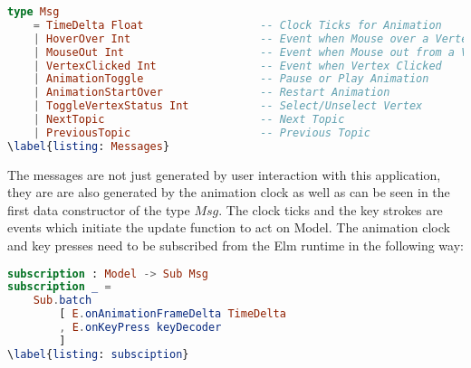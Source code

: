 \begin{lstlisting}[language=elm
                  , caption={
                              Abstract Data Type Msg with it's Data Constructors.
                              These messages are emanated from buttons, graph vertices
                              system clocks and are received by the update function
                              to change the $Model$, which carries the state of the
                              program.
                  }
                  ]
type Msg
    = TimeDelta Float                  -- Clock Ticks for Animation
    | HoverOver Int                    -- Event when Mouse over a Vertex                              
    | MouseOut Int                     -- Event when Mouse out from a Vertex                               
    | VertexClicked Int                -- Event when Vertex Clicked                              
    | AnimationToggle                  -- Pause or Play Animation
    | AnimationStartOver               -- Restart Animation
    | ToggleVertexStatus Int           -- Select/Unselect Vertex
    | NextTopic                        -- Next Topic
    | PreviousTopic                    -- Previous Topic
\label{listing: Messages}
\end{lstlisting}

The messages are not just generated by user interaction with this application,
they are are also generated by the animation clock as well as can be seen in
the first data constructor of the type $Msg$.  The clock ticks and the key
strokes are events which initiate the update function to act on Model.  The
animation clock and key presses need to be subscribed from the Elm runtime in
the following way:

\begin{lstlisting}[language=elm
                  , caption={
                            Subscription of Animation clock and Key presses services.
                            Subscriptions are used to catch the events which are
                            emanated outside the DOM. In this code, a system clock
                            and key presses are subscribed to by the program.
                            }
                  ]
subscription : Model -> Sub Msg
subscription _ =
    Sub.batch
        [ E.onAnimationFrameDelta TimeDelta
        , E.onKeyPress keyDecoder
        ]
\label{listing: subsciption}
\end{lstlisting}


